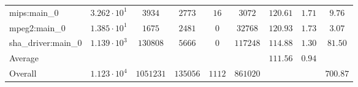 \begin{tabular}{|l|c|c|c|c|c|c|c|c|}
mips:main\_0            & $ 3.262 \cdot 10^{1} $ & $ 3934    $ & $ 2773   $ & $ 16   $ & $ 3072   $ & $ 120.61      $ & $ 1.71    $ & $ 9.76    $ \\
mpeg2:main\_0           & $ 1.385 \cdot 10^{1} $ & $ 1675    $ & $ 2481   $ & $ 0    $ & $ 32768  $ & $ 120.93      $ & $ 1.73    $ & $ 3.07    $ \\
sha\_driver:main\_0     & $ 1.139 \cdot 10^{3} $ & $ 130808  $ & $ 5666   $ & $ 0    $ & $ 117248 $ & $ 114.88      $ & $ 1.30    $ & $ 81.50   $ \\
\hline
Average                 & $                    $ & $         $ & $        $ & $      $ & $        $ & $ 111.56      $ & $ 0.94    $ & $         $ \\
\hline
Overall                 & $ 1.123 \cdot 10^{4} $ & $ 1051231 $ & $ 135056 $ & $ 1112 $ & $ 861020 $ & $             $ & $         $ & $ 700.87  $ \\
\hline
\end{tabular}
